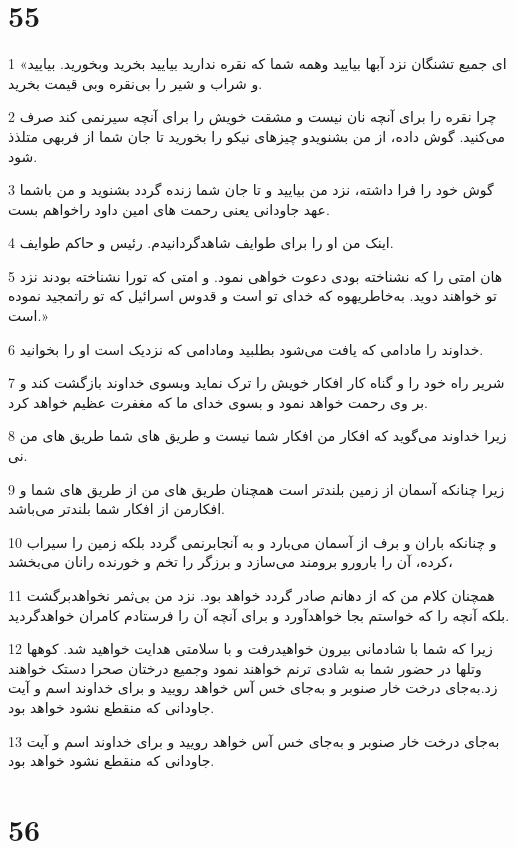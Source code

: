 \chapter{55}

\par 1 «ای جمیع تشنگان نزد آبها بیایید وهمه شما که نقره ندارید بیایید بخرید وبخورید. بیایید و شراب و شیر را بی‌نقره وبی قیمت بخرید.
\par 2 چرا نقره را برای آنچه نان نیست و مشقت خویش را برای آنچه سیرنمی کند صرف می‌کنید. گوش داده، از من بشنویدو چیزهای نیکو را بخورید تا جان شما از فربهی متلذذ شود.
\par 3 گوش خود را فرا داشته، نزد من بیایید و تا جان شما زنده گردد بشنوید و من باشما عهد جاودانی یعنی رحمت های امین داود راخواهم بست.
\par 4 اینک من او را برای طوایف شاهدگردانیدم. رئیس و حاکم طوایف.
\par 5 هان امتی را که نشناخته بودی دعوت خواهی نمود. و امتی که تورا نشناخته بودند نزد تو خواهند دوید. به‌خاطریهوه که خدای تو است و قدوس اسرائیل که تو راتمجید نموده است.»
\par 6 خداوند را مادامی که یافت می‌شود بطلبید ومادامی که نزدیک است او را بخوانید.
\par 7 شریر راه خود را و گناه کار افکار خویش را ترک نماید وبسوی خداوند بازگشت کند و بر وی رحمت خواهد نمود و بسوی خدای ما که مغفرت عظیم خواهد کرد.
\par 8 زیرا خداوند می‌گوید که افکار من افکار شما نیست و طریق های شما طریق های من نی.
\par 9 زیرا چنانکه آسمان از زمین بلندتر است همچنان طریق های من از طریق های شما و افکارمن از افکار شما بلندتر می‌باشد.
\par 10 و چنانکه باران و برف از آسمان می‌بارد و به آنجابرنمی گردد بلکه زمین را سیراب کرده، آن را بارورو برومند می‌سازد و برزگر را تخم و خورنده رانان می‌بخشد،
\par 11 همچنان کلام من که از دهانم صادر گردد خواهد بود. نزد من بی‌ثمر نخواهدبرگشت بلکه آنچه را که خواستم بجا خواهدآورد و برای آنچه آن را فرستادم کامران خواهدگردید.
\par 12 زیرا که شما با شادمانی بیرون خواهیدرفت و با سلامتی هدایت خواهید شد. کوهها وتلها در حضور شما به شادی ترنم خواهند نمود وجمیع درختان صحرا دستک خواهند زد.به‌جای درخت خار صنوبر و به‌جای خس آس خواهد رویید و برای خداوند اسم و آیت جاودانی که منقطع نشود خواهد بود.
\par 13 به‌جای درخت خار صنوبر و به‌جای خس آس خواهد رویید و برای خداوند اسم و آیت جاودانی که منقطع نشود خواهد بود.
 
\chapter{56}

